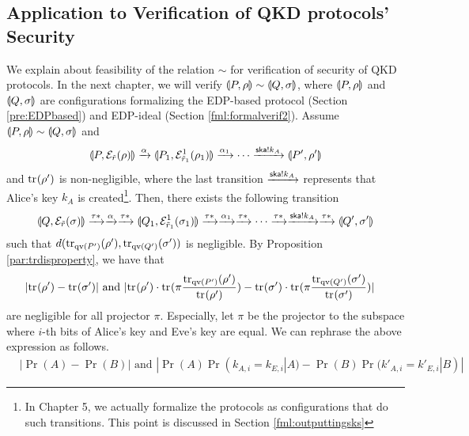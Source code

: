 \subsection{Application to Verification of QKD protocols' Security}
We explain about feasibility of the relation $\sim$ for verification
of security of QKD protocols. In the next chapter, we will verify
$\llparenthesis P, \rho \rrparenthesis \sim \llparenthesis Q, \sigma \rrparenthesis$, where
$\llparenthesis P, \rho \rrparenthesis$ and $\llparenthesis Q, \sigma \rrparenthesis$ are configurations formalizing the EDP-based protocol
(Section \ref{pre:EDPbased}) and EDP-ideal (Section \ref{fml:formalverif2}).
Assume $\llparenthesis P, \rho \rrparenthesis \sim \llparenthesis Q, \sigma \rrparenthesis$ and
\[
 \llparenthesis P, \mathcal{E}_{\tilde r}(\rho) \rrparenthesis \xrightarrow{\alpha} 
 \llparenthesis P_1, \mathcal{E}^1_{\tilde r_1}(\rho_1) \rrparenthesis \xrightarrow{\alpha_1} \cdots 
 \xrightarrow{\mathsf{ska}! k_A} \llparenthesis P', \rho' \rrparenthesis
\]
and ${\rm tr}_{}(\rho')$ is non-negligible, where
the last transition $\xrightarrow{\mathsf{ska}! k_A}$
represents that Alice's key $k_A$ is created\footnote{In Chapter 5, we
actually formalize the protocols as configurations
that do such transitions. This point is discussed in Section \ref{fml:outputtingsks}}.
Then, there exists the following
transition
\[
 \llparenthesis Q, \mathcal{E}_{\tilde r}(\sigma) \rrparenthesis \xrightarrow{\tau*} \xrightarrow{\alpha} \xrightarrow{\tau*} 
 \llparenthesis Q_1, \mathcal{E}^1_{\tilde r_1}(\sigma_1) \rrparenthesis \xrightarrow{\tau*} \xrightarrow{\alpha_1} \xrightarrow{\tau*} \cdots 
 \xrightarrow{\tau*} \xrightarrow{\mathsf{ska}! k_A} \xrightarrow{\tau*} \llparenthesis Q', \sigma' \rrparenthesis
\]
such that $d({\rm tr}_{\mathrm{qv}(P')}(\rho'), {\rm tr}_{\mathrm{qv}(Q')}(\sigma'))$ is negligible.
By Proposition \ref{par:trdisproperty}, we have that
\begin{align*}
 &|{\rm tr}_{}(\rho') - {\rm tr}_{}(\sigma')| \mbox{ and }
 |{\rm tr}_{}(\rho')\cdot{\rm tr}_{}(\pi\frac{{\rm tr}_{\mathrm{qv}(P')}(\rho')}{{\rm tr}_{}(\rho')}) -
 {\rm tr}_{}(\sigma')\cdot{\rm tr}_{}(\pi\frac{{\rm tr}_{\mathrm{qv}(Q')}(\sigma')}{{\rm tr}_{}(\sigma')}) | 
\end{align*}
are negligible for all projector $\pi$. Especially, let $\pi$ be
the projector to the subspace where $i$-th bits of Alice's key and
Eve's key are equal. We can rephrase the above expression as follows.
\begin{align*}
 &|\Pr(A) - \Pr(B)| \mbox{ and }
 |\Pr(A)\Pr(k_{A,i} = k_{E,i}|A) - \Pr(B)\Pr(k'_{A,i} = k'_{E,i}|B)|
\end{align*}

